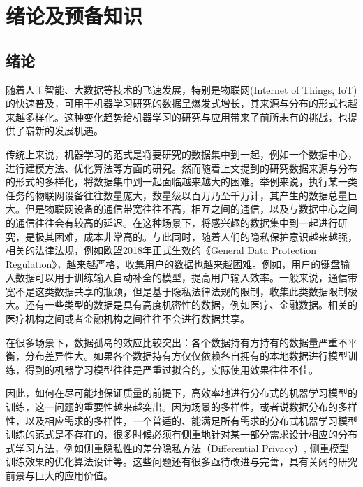 \chapter{\hspace{-1mm}\bf 绪论及预备知识}
\label{chap1}
\section{绪论}
\label{sec:introduction}


随着人工智能、大数据等技术的飞速发展，特别是物联网(Internet of Things, IoT)的快速普及，可用于机器学习研究的数据呈爆发式增长，其来源与分布的形式也越来越多样化。这种变化趋势给机器学习的研究与应用带来了前所未有的挑战，也提供了崭新的发展机遇。

传统上来说，机器学习的范式是将要研究的数据集中到一起，例如一个数据中心，进行建模方法、优化算法等方面的研究。然而随着上文提到的研究数据来源与分布的形式的多样化，将数据集中到一起面临越来越大的困难。举例来说，执行某一类任务的物联网设备往往数量庞大，数量级以百万乃至千万计，其产生的数据总量巨大。但是物联网设备的通信带宽往往不高，相互之间的通信，以及与数据中心之间的通信往往会有较高的延迟。在这种场景下，将感兴趣的数据集中到一起进行研究，是极其困难，成本非常高的。与此同时，随着人们的隐私保护意识越来越强，相关的法律法规，例如欧盟2018年正式生效的《General Data Protection Regulation》，越来越严格，收集用户的数据也越来越困难\citep{Albrecht_2016}。例如，用户的键盘输入数据可以用于训练输入自动补全的模型，提高用户输入效率\citep{fl_keyboard}。一般来说，通信带宽不是这类数据共享的瓶颈，但是基于隐私法律法规的限制，收集此类数据限制极大。还有一些类型的数据是具有高度机密性的数据，例如医疗、金融数据。相关的医疗机构之间或者金融机构之间往往不会进行数据共享。

在很多场景下，数据孤岛的效应比较突出：各个数据持有方持有的数据量严重不平衡，分布差异性大。如果各个数据持有方仅仅依赖各自拥有的本地数据进行模型训练，得到的机器学习模型往往是严重过拟合的，实际使用效果往往不佳。

因此，如何在尽可能地保证质量的前提下，高效率地进行分布式的机器学习模型的训练，这一问题的重要性越来越突出。因为场景的多样性，或者说数据分布的多样性，以及相应需求的多样性，一个普适的、能满足所有需求的分布式机器学习模型训练的范式是不存在的，很多时候必须有侧重地针对某一部分需求设计相应的分布式学习方法，例如侧重隐私性的差分隐私方法（Differential Privacy）\citep{Dwork_2008_DP}, 侧重模型训练效果的优化算法设计\citep{boyd2011distributed}等。这些问题还有很多亟待改进与完善，具有关阔的研究前景与巨大的应用价值。

